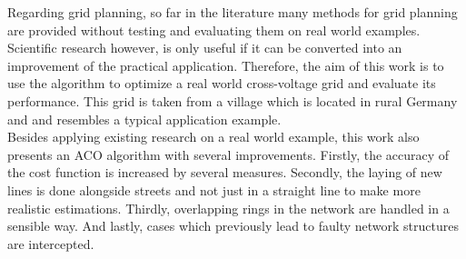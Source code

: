 Regarding grid planning, so far in the literature many methods for grid planning are provided without testing and evaluating them on real world examples. Scientific research however, is only useful if it can be converted into an improvement of the practical application. Therefore, the aim of this work is to use the algorithm to optimize a real world cross-voltage grid and evaluate its performance. This grid is taken from a village which is located in rural Germany and and resembles a typical application example.\\
Besides applying existing research on a real world example, this work also presents an ACO algorithm with several improvements. Firstly, the accuracy of the cost function is increased by several measures. Secondly, the laying of new lines is done alongside streets and not just in a straight line to make more realistic estimations. Thirdly, overlapping rings in the network are handled in a sensible way. And lastly, cases which previously lead to faulty network structures are intercepted.











